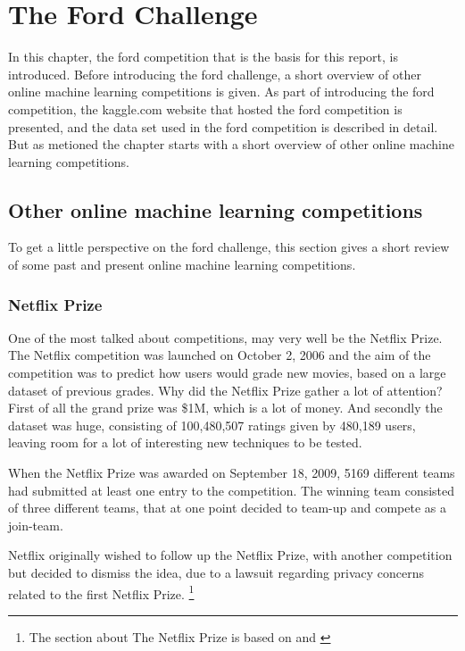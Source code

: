 \chapter{The Ford Challenge} 
In this chapter, the ford competition that is the basis for this report, is introduced. Before introducing the ford challenge, a short overview of other online machine learning competitions is given. As part of introducing the ford competition, the kaggle.com website that hosted the ford competition is presented, and the data set used in the ford competition is described in detail. But as metioned the chapter starts with a short overview of other online machine learning competitions.

\section{Other online machine learning competitions}
To get a little perspective on the ford challenge, this section gives a short review of some past and present online machine learning competitions.

\subsection{Netflix Prize}
One of the most talked about competitions, may very well be the Netflix Prize. The Netflix competition was launched on October 2, 2006 and the aim of the competition was to predict how users would grade new movies, based on a large dataset of previous grades. Why did the Netflix Prize gather a lot of attention? First of all the grand prize was \$1M, which is a lot of money. And secondly the dataset was huge, consisting of 100,480,507 ratings given by 480,189 users, leaving room for a lot of interesting new techniques to be tested. \par 
When the Netflix Prize was awarded on September 18, 2009, 5169 different teams had submitted at least one entry to the competition. The winning team consisted of three different teams, that at one point decided to team-up and compete as a join-team.\par 
Netflix originally wished to follow up the Netflix Prize, with another competition but decided to dismiss the idea, due to a lawsuit regarding privacy concerns related to the first Netflix Prize. \footnote{The section about The Netflix Prize is based on \citet{wiki:netflix_prize} and \citet{netflix_leaderboard}}

